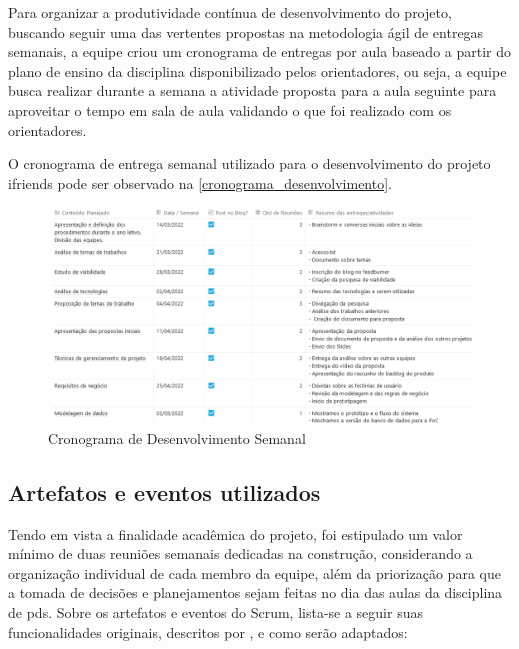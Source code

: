 Para organizar a produtividade contínua de desenvolvimento do projeto, buscando seguir uma das vertentes propostas na metodologia ágil de entregas semanais, a equipe criou um cronograma de entregas por aula baseado a partir do plano de ensino da disciplina disponibilizado pelos orientadores, ou seja, a equipe busca realizar durante a semana a atividade proposta para a aula seguinte para aproveitar o tempo em sala de aula validando o que foi realizado com os orientadores. 

O cronograma de entrega semanal utilizado para o desenvolvimento do projeto \gls{ifriends} pode ser observado na \autoref{cronograma_desenvolvimento}.

\begin{figure}[htb]
\centering
\caption{Cronograma de Desenvolvimento Semanal}
\label{cronograma_desenvolvimento}
\includegraphics[width=1.0\textwidth]{anexos/Imagens_Proposta/cronograma_desenvolvimento.png}
\end{figure}
\FloatBarrier

\subsection{Artefatos e eventos utilizados}
\label{artefatos}
Tendo em vista a finalidade acadêmica do projeto, foi estipulado um valor mínimo de duas reuniões semanais dedicadas na construção, considerando a organização individual de cada membro da equipe, além da priorização para que a tomada de decisões e planejamentos sejam feitas no dia das aulas da disciplina de \acs{pds}. Sobre os artefatos e eventos do Scrum, lista-se a seguir suas funcionalidades originais, descritos por , e como serão adaptados:

